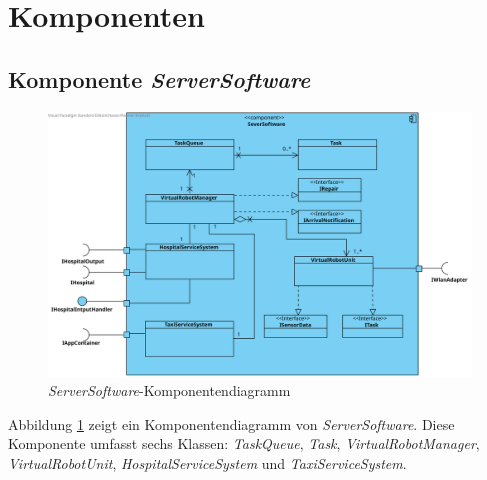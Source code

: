 \section{Komponenten}

\subsection{Komponente \textit{ServerSoftware}}
\begin{figure}[H]
\centering
\includegraphics[height=1.0\textwidth, angle=0]{img/2-Entwurf-5-ServerSoftware}
\caption{\emph{ServerSoftware}-Komponentendiagramm}
\label{KomponentenStruktur1}
\end{figure}
Abbildung \ref{KomponentenStruktur1} zeigt ein Komponentendiagramm von \emph{ServerSoftware}. 
Diese Komponente umfasst sechs Klassen: \textit{TaskQueue}, \textit{Task}, \textit{VirtualRobotManager}, \textit{VirtualRobotUnit}, \textit{HospitalServiceSystem} und \textit{TaxiServiceSystem}.

